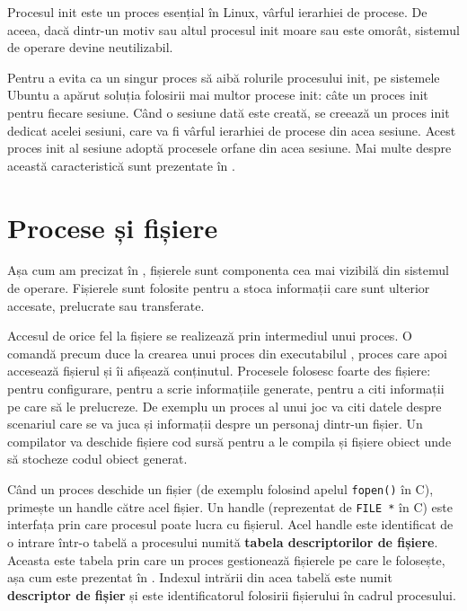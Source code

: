 Procesul init este un proces esențial în Linux, vârful ierarhiei de procese.
De aceea, dacă dintr-un motiv sau altul procesul init moare sau este omorât, sistemul de operare devine neutilizabil.

Pentru a evita ca un singur proces să aibă rolurile procesului init, pe sistemele Ubuntu a apărut soluția folosirii mai multor procese init: câte un proces init pentru fiecare sesiune.
Când o sesiune dată este creată, se creează un proces init dedicat acelei sesiuni, care va fi vârful ierarhiei de procese din acea sesiune.
Acest proces init al sesiune adoptă procesele orfane din acea sesiune.
Mai multe despre această caracteristică sunt prezentate în .

\section{Procese și fișiere}
\label{sec:process:files}

Așa cum am precizat în , fișierele sunt componenta cea mai vizibilă din sistemul de operare.
Fișierele sunt folosite pentru a stoca informații care sunt ulterior accesate, prelucrate sau transferate.

Accesul de orice fel la fișiere se realizează prin intermediul unui proces.
O comandă precum  duce la crearea unui proces din executabilul , proces care apoi accesează fișierul  și îi afișează conținutul.
Procesele folosesc foarte des fișiere: pentru configurare, pentru a scrie informațiile generate, pentru a citi informații pe care să le prelucreze.
De exemplu un proces al unui joc va citi datele despre scenariul care se va juca și informații despre un personaj dintr-un fișier.
Un compilator va deschide fișiere cod sursă pentru a le compila și fișiere obiect unde să stocheze codul obiect generat.

Când un proces deschide un fișier (de exemplu folosind apelul \texttt{fopen()} în C), primește un handle către acel fișier.
Un handle (reprezentat de \texttt{FILE *} în C) este interfața prin care procesul poate lucra cu fișierul.
Acel handle este identificat de o intrare într-o tabelă a procesului numită \textbf{tabela descriptorilor de fișiere}.
Aceasta este tabela prin care un proces gestionează fișierele pe care le folosește, așa cum este prezentat în .
Indexul intrării din acea tabelă este numit \textbf{descriptor de fișier} și este identificatorul folosirii fișierului în cadrul procesului.

